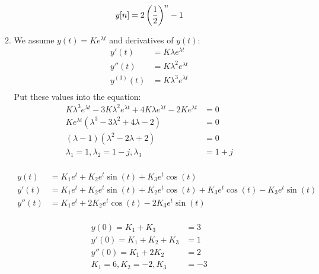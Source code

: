 \documentclass[10pt,a4paper, margin=1in]{article}
\begin{document}
\begin{enumerate}
\begin{enumerate}
   \begin{equation}
       y[n]=2 \left( \frac{1}{2}\right)^n-1\\
   \end{equation} 
    
    \item %
    We assume $y(t)=Ke^{\lambda t}$ and derivatives of $y(t)$:\\
    \begin{equation}
        \begin{split}
            y'(t)&=K\lambda e^{\lambda t}\\
    y''(t)&=K \lambda^2 e^{\lambda t}\\
    y^{(3)}(t)&=K \lambda^3 e^{\lambda t}\\
        \end{split}
    \end{equation}
    Put these values into the equation:
    \begin{equation}
        \begin{split}
            K\lambda^3e^{\lambda t}-3K\lambda^2e^{\lambda t}+4K\lambda e^{\lambda t}-2Ke^{\lambda t}&=0\\
            Ke^{\lambda t}(\lambda^3-3\lambda^2+4\lambda-2)&=0\\
            (\lambda-1)(\lambda^2-2\lambda+2)&=0\\
            \lambda_1 =1, \lambda_2=1-j, \lambda_3&=1+j\\
        \end{split}
    \end{equation}
    
    \begin{equation}
        \begin{split}
            y(t)&=K_1e^t+K_2e^t\sin(t)+K_3e^t\cos(t)\\
            y'(t)&=K_1e^t+K_2e^t\sin(t)+K_2e^t\cos(t)+K_3e^t\cos(t)-K_3e^t\sin(t)\\
            y''(t)&=K_1e^t+2K_2e^t\cos(t)-2K_3e^t\sin(t)\\
        \end{split}
    \end{equation}
    
    \begin{equation}
        \begin{split}
            y(0)=K_1+K_3&=3\\
            y'(0)=K_1+K_2+K_3&=1\\
            y''(0)=K_1+2K_2&=2\\
            K_1=6, K_2=-2, K_3&=-3 \\
        \end{split}
    \end{equation}
    

\end{enumerate}
\end{enumerate}
\end{document}
